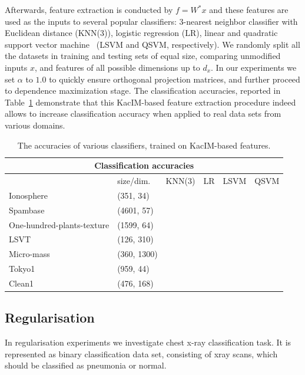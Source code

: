 \documentclass{article}
\begin{document}
\noindent Afterwards, feature extraction is conducted by $f = W^{*}x$ and these features are used as the inputs to several popular classifiers: $3$-nearest neighbor classifier with Euclidean distance (KNN(3)), logistic regression (LR), linear and quadratic support vector machine~\cite{10.5555/3279302} (LSVM and QSVM, respectively). We randomly split all the datasets in training and testing sets of equal size, comparing unmodified inputs $x$, and features of all possible dimensions up to $d_{x}$.  In our experiments we set $\alpha$ to $1.0$ to quickly ensure orthogonal projection matrices, and further proceed to dependence maximization stage. 
The classification accuracies, reported in Table~\ref{table:classification_accuracies} demonstrate that this KacIM-based feature extraction procedure indeed allows to increase classification accuracy when applied to real data sets from various domains.

\begin{table}	
\centering
\begin{tabular}{ |p{3cm}|p{2.0cm}||p{1.5cm}|p{1cm}|p{1cm}|p{1cm}|  }
	\hline
	\multicolumn{6}{|c|}{Classification accuracies} \\
	\hline
	& size/dim. & KNN(3) & LR & LSVM & QSVM  \\
	\hline
	Ionosphere & (351, 34) &     &&    & \\	
	\hline
	Spambase & (4601, 57) & & & & \\
	\hline
	One-hundred-plants-texture   & (1599, 64)
	  &     & &    & \\
	\hline	
	LSVT  & (126, 310) &     &  &    & \\
	\hline
	Micro-mass  & (360, 1300)
	 &     &  &    & \\
	\hline	
	Tokyo1 & (959, 44) &     & &    & \\
	\hline	
	Clean1 & (476, 168)
	 &     & &    & \\
	\hline
\end{tabular}
\caption{The accuracies of various classifiers, trained on KacIM-based features.}
\label{table:classification_accuracies}	
\end{table}

\subsection{Regularisation}
In regularisation experiments we investigate chest x-ray classification task. It is represented as binary classification data set, consisting of xray scans, which should be classified as pneumonia or normal.
\end{document}

